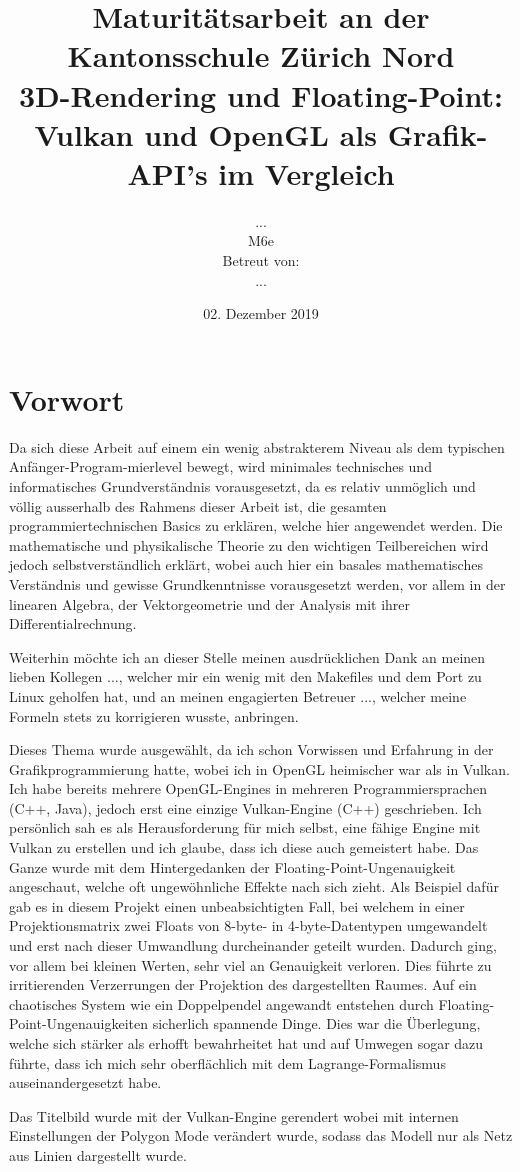 \documentclass[titlepage, 11pt, a4paper, ngerman]{article}
\title{\large Maturitätsarbeit an der Kantonsschule Zürich Nord \\ \huge 3D-Rendering und Floating-Point: Vulkan und OpenGL als Grafik-API's im Vergleich}
\date{02. Dezember 2019}
\author{... \\ M6e \\ Betreut von: \\ ...}
\begin{document}
\maketitle
{}


\newpage
{}
\tableofcontents

\newpage
{}
\section{Vorwort}
Da sich diese Arbeit auf einem ein wenig abstrakterem Niveau als dem typischen Anfänger-Program-mierlevel bewegt, wird minimales technisches und informatisches Grundverständnis vorausgesetzt, da es relativ unmöglich und völlig ausserhalb des Rahmens dieser Arbeit ist, die gesamten programmiertechnischen Basics zu erklären, welche hier angewendet werden. Die mathematische und physikalische Theorie zu den wichtigen Teilbereichen wird jedoch selbstverständlich erklärt, wobei auch hier ein basales mathematisches Verständnis und gewisse Grundkenntnisse vorausgesetzt werden, vor allem in der linearen Algebra, der Vektorgeometrie und der Analysis mit ihrer Differentialrechnung. \par
Weiterhin möchte ich an dieser Stelle meinen ausdrücklichen Dank an meinen lieben Kollegen ..., welcher mir ein wenig mit den \glspl{Makefile} und dem Port zu \gls{Linux} geholfen hat, und an meinen engagierten Betreuer ..., welcher meine Formeln stets zu korrigieren wusste, anbringen.\par
Dieses Thema wurde ausgewählt, da ich schon Vorwissen und Erfahrung in der Grafikprogrammierung hatte, wobei ich in \acrshort{OpenGL} heimischer war als in Vulkan. Ich habe bereits mehrere OpenGL-\glspl{Engine} in mehreren Programmiersprachen (C++, Java), jedoch erst eine einzige Vulkan-\gls{Engine} (C++) geschrieben. Ich persönlich sah es als Herausforderung für mich selbst, eine fähige \gls{Engine} mit Vulkan zu erstellen und ich glaube, dass ich diese auch gemeistert habe. Das Ganze wurde mit dem Hintergedanken der \gls{Floating-Point}-Ungenauigkeit angeschaut, welche oft ungewöhnliche Effekte nach sich zieht. Als Beispiel dafür gab es in diesem Projekt einen unbeabsichtigten Fall, bei welchem in einer Projektionsmatrix zwei \glspl{Float} von 8-byte- in 4-byte-Datentypen umgewandelt und erst nach dieser Umwandlung durcheinander geteilt wurden. Dadurch ging, vor allem bei kleinen Werten, sehr viel an Genauigkeit verloren. Dies führte zu irritierenden Verzerrungen der Projektion des dargestellten Raumes. Auf ein chaotisches System wie ein Doppelpendel angewandt entstehen durch \gls{Floating-Point}-Ungenauigkeiten sicherlich spannende Dinge. Dies war die Überlegung, welche sich stärker als erhofft bewahrheitet hat und auf Umwegen sogar dazu führte, dass ich mich sehr oberflächlich mit dem Lagrange-Formalismus auseinandergesetzt habe.\par
Das Titelbild wurde mit der Vulkan-Engine gerendert wobei mit internen Einstellungen der Polygon Mode verändert wurde, sodass das Modell nur als Netz aus Linien dargestellt wurde.
\end{document}
